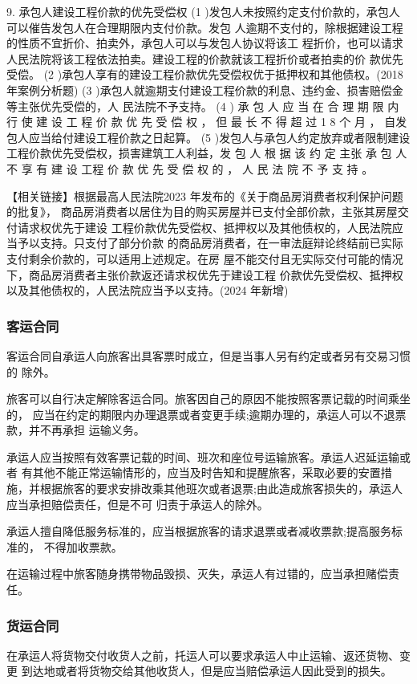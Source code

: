 \documentclass[UTF8,12pt]{ctexart}
\numberwithin{equation}{section} %
\numberwithin{figure}{section}
\numberwithin{table}{section}
\begin{document}
	9. 承包人建设工程价款的优先受偿权
	(1 )发包人未按照约定支付价款的，承包人可以催告发包人在合理期限内支付价款。发包 人逾期不支付的，除根据建设工程的性质不宜折价、拍卖外，承包人可以与发包人协议将该工 程折价，也可以请求人民法院将该工程依法拍卖。建设工程的价款就该工程折价或者拍卖的价 款优先受偿。
	(2 )承包人享有的建设工程价款优先受偿权优于抵押权和其他债权。(2018 年案例分析题) (3 )承包人就逾期支付建设工程价款的利息、违约金、损害赔偿金等主张优先受偿的，人 民法院不予支持。
	(4 ) 承 包 人 应 当 在 合 理 期 限 内 行 使 建 设 工 程 价 款 优 先 受 偿 权 ， 但 最 长 不 得 超 过 1 8 个 月 ， 自发包人应当给付建设工程价款之日起算。
	(5 )发包人与承包人约定放弃或者限制建设工程价款优先受偿权，损害建筑工人利益，发 包 人 根 据 该 约 定 主张 承 包 人 不 享 有 建 设 工程 价 款 优 先 受 偿 权 的 ， 人 民 法 院 不 予 支 持 。
	
	【相关链接】根据最高人民法院2023 年发布的《关于商品房消费者权利保护问题的批复》， 商品房消费者以居住为目的购买房屋并已支付全部价款，主张其房屋交付请求权优先于建设 工程价款优先受偿权、抵押权以及其他债权的，人民法院应当予以支持。只支付了部分价款 的商品房消费者，在一审法庭辩论终结前已实际支付剩余价款的，可以适用上述规定。在房 屋不能交付且无实际交付可能的情况下，商品房消费者主张价款返还请求权优先于建设工程 价款优先受偿权、抵押权以及其他债权的，人民法院应当予以支持。(2024 年新增)
	
	\subsubsection{客运合同}
	客运合同自承运人向旅客出具客票时成立，但是当事人另有约定或者另有交易习惯的 除外。
	
	旅客可以自行决定解除客运合同。旅客因自己的原因不能按照客票记载的时间乘坐的， 应当在约定的期限内办理退票或者变更手续;逾期办理的，承运人可以不退票款，并不再承担 运输义务。
	
	承运人应当按照有效客票记载的时间、班次和座位号运输旅客。承运人迟延运输或者 有其他不能正常运输情形的，应当及时告知和提醒旅客，采取必要的安置措施，并根据旅客的要求安排改乘其他班次或者退票;由此造成旅客损失的，承运人应当承担赔偿责任，但是不可 归责于承运人的除外。
	
	承运人擅自降低服务标准的，应当根据旅客的请求退票或者减收票款;提高服务标准的， 不得加收票款。
	
	在运输过程中旅客随身携带物品毁损、灭失，承运人有过错的，应当承担赌偿责任。
	
	
	\subsubsection{货运合同}
	在承运人将货物交付收货人之前，托运人可以要求承运人中止运输、返还货物、变更 到达地或者将货物交给其他收货人，但是应当赔偿承运人因此受到的损失。
	
\end{document}
